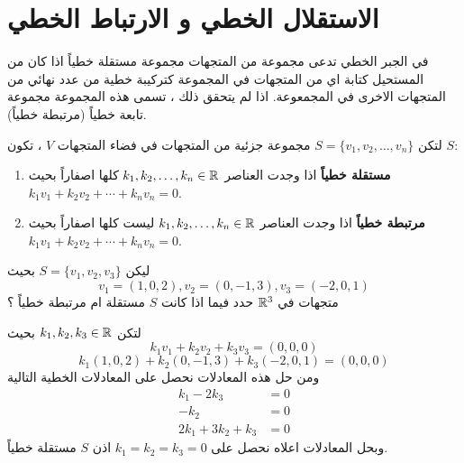 \section[الاستقلال الخطي و الارتباط الخطي]{الاستقلال الخطي و الارتباط الخطي \cite{key1}}
في الجبر الخطي تدعى مجموعة من المتجهات مجموعة مستقلة خطياً اذا كان من المستحيل كتابة اي من المتجهات في المجموعة كتركيبة خطية من  عدد نهائي من المتجهات الاخرى في المجمعوعة. اذا لم يتحقق ذلك ، تسمى هذه المجموعة مجموعة تابعة خطياً (مرتبطة خطياً).

\begin{definition}
	لتكن $S=\{v_1, v_2, \dots, v_n\}$ مجموعة جزئية من المتجهات في فضاء المتجهات $V$ ، تكون $S$:
	\begin{enumerate}
		\item \textbf{مستقلة خطياً} اذا وجدت العناصر $k_1, k_2, \dots, k_n\in \mathbb{R}$ كلها اصفاراً بحيث \\$k_1v_1 + k_2v_2 + \cdots + k_n v_n = 0$.
		\item \textbf{مرتبطة خطياً} اذا وجدت العناصر $k_1, k_2, \dots, k_n\in \mathbb{R}$ ليست  كلها اصفاراً بحيث \\$k_1v_1 + k_2v_2 + \cdots + k_n v_n = 0$.
	\end{enumerate}
\end{definition}

\begin{example}
	ليكن $S = \{v_1, v_2, v_3\}$ بحيث 
	\[
	v_1 = (1, 0,2), v_2 = (0,-1,3) , v_3=(-2,0,1)
	\]
	متجهات في $\mathbb{R}^3$ حدد فيما اذا كانت $S$ مستقلة ام مرتبطة خطياً ؟
\end{example}
\begin{solution}
	لتكن $k_1,k_2,k_3\in \mathbb{R}$ بحيث 
	\[
	k_1 v_1 + k_2v_2 + k_3v_3 = (0, 0, 0)
	\]
	\[
	k_1(1,0,2) + k_2(0,-1,3) + k_3(-2,0,1) = (0, 0, 0)
	\]
	ومن حل هذه المعادلات نحصل على المعادلات الخطية التالية
	\begin{align*}
		k_1 -2k_3 &= 0\\
		-k_2 &= 0\\
		2k_1 + 3k_2 + k_3 &= 0
	\end{align*}
	وبحل المعادلات اعلاه نحصل على $k_1 = k_2 = k_3 = 0$
	اذن $S$ مستقلة خطياً.
\end{solution}

